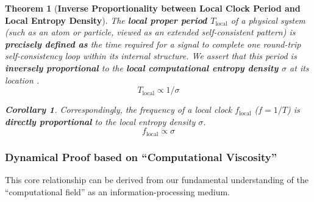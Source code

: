 \documentclass[11pt, a4paper]{article}
\newtheorem{theorem}{Theorem}[section]
\newtheorem{corollary}{Corollary}[section]
\begin{document}
\begin{theorem}[\textbf{Inverse Proportionality between Local Clock Period and Local Entropy Density}]
The \textbf{local proper period $T_{\text{local}}$} of a physical system (such as an atom or particle, viewed as an extended self-consistent pattern) is \textbf{precisely defined as} the time required for a signal to complete one round-trip self-consistency loop within its internal structure. We assert that this period is \textbf{inversely proportional} to the \textbf{local computational entropy density $\sigma$} at its location \cite{Einstein1905}.
\[
T_{\text{local}} \propto 1/\sigma
\]
\begin{corollary}
Correspondingly, the frequency of a local clock $f_{\text{local}}$ ($f=1/T$) is \textbf{directly proportional} to the local entropy density $\sigma$.
\[
f_{\text{local}} \propto \sigma
\]
\end{corollary}
\end{theorem}

\subsubsection*{Dynamical Proof based on ``Computational Viscosity''}

This core relationship can be derived from our fundamental understanding of the ``computational field'' as an information-processing medium.
\end{document}
